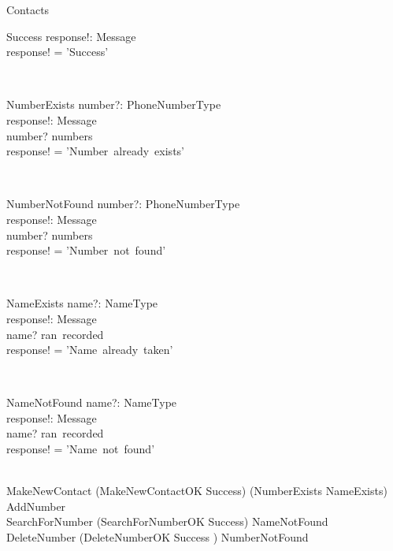 \begin{class}{Contacts}
\begin{op}{Success}
response!: Message \\
\ST
response! = 'Success'
\end{op}\\
\zbreak
\begin{op}{NumberExists}
number?: PhoneNumberType \\
response!: Message \\
\ST
number? \in numbers \\
response! = 'Number~already~exists'
\end{op}\\
\begin{op}{NumberNotFound}
number?: PhoneNumberType \\
response!: Message \\
\ST
number? \notin numbers \\
response! = 'Number~not~found'
\end{op}\\
\begin{op}{NameExists}
name?: NameType \\
response!: Message \\
\ST
name? \in ran~recorded \\
response! = 'Name~already~taken'
\end{op}\\
\begin{op}{NameNotFound}
    name?: NameType \\
    response!: Message \\
    \ST
    name? \notin ran~recorded \\
    response! = 'Name~not~found'
\end{op}\\
\also
MakeNewContact \sdef (MakeNewContactOK \wedge Success) \oplus (NumberExists \lor NameExists) \\
AddNumber \sdef \\
SearchForNumber \sdef (SearchForNumberOK \wedge Success) \oplus NameNotFound \\
DeleteNumber \sdef (DeleteNumberOK \wedge Success ) \oplus NumberNotFound  \\
\end{class}